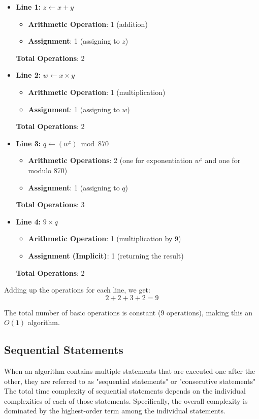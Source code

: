 \begin{itemize}
    \item \textbf{Line 1:} $z \gets x + y$
    \begin{itemize}
        \item \textbf{Arithmetic Operation}: 1 (addition)
        \item \textbf{Assignment}: 1 (assigning to $z$)
    \end{itemize}
    \textbf{Total Operations}: 2
    
    \item \textbf{Line 2:} $w \gets x \times y$
    \begin{itemize}
        \item \textbf{Arithmetic Operation}: 1 (multiplication)
        \item \textbf{Assignment}: 1 (assigning to $w$)
    \end{itemize}
    \textbf{Total Operations}: 2
    
    \item \textbf{Line 3:} $q \gets (w^z) \bmod 870$
    \begin{itemize}
        \item \textbf{Arithmetic Operations}: 2 (one for exponentiation $w^z$ and one for modulo 870)
        \item \textbf{Assignment}: 1 (assigning to $q$)
    \end{itemize}
    \textbf{Total Operations}: 3
    
    \item \textbf{Line 4:} \Return $9 \times q$
    \begin{itemize}
        \item \textbf{Arithmetic Operation}: 1 (multiplication by 9)
        \item \textbf{Assignment (Implicit)}: 1 (returning the result)
    \end{itemize}
    \textbf{Total Operations}: 2
\end{itemize}

Adding up the operations for each line, we get:
\[
2 + 2 + 3 + 2 = 9
\]

The total number of basic operations is constant (9 operations), making this an $O(1)$ algorithm.

\subsection*{Sequential Statements}

When an algorithm contains multiple statements that are executed one after the other, they are referred to as "sequential statements" or "consecutive statements" The total time complexity of sequential statements depends on the individual complexities of each of those statements. Specifically, the overall complexity is dominated by the highest-order term among the individual statements.

